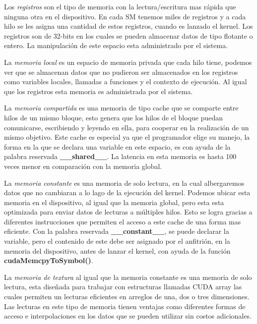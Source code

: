 Los \textit{registros} son el tipo de memoria con la lectura/escritura mas rápida que ninguna otra en el dispositivo. En cada SM tenemos miles de registros y a cada hilo se les asigna una cantidad de estos registros, cuando es lanzado el kernel. Los registros son de 32-bits en los cuales se pueden almacenar datos de tipo flotante o entero. La manipulación de este espacio esta administrado por el sistema.

La \textit{memoria local} es un espacio de memoria privada que cada hilo tiene, podemos ver que se almacenan datos que no pudieron ser almacenados en los registros como variables locales, llamadas a funciones y el contexto de ejecución. Al igual que los registros esta memoria es administrada por el sistema.

La \textit{memoria compartida} es una memoria de tipo cache que se comparte entre hilos de un mismo bloque, esto genera que los hilos de el bloque puedan comunicarse, escribiendo y leyendo en ella, para cooperar en la realización de un mismo objetivo. Este cache es especial ya que el programador elige su manejo, la forma en la que se declara una variable en este espacio, es con ayuda de la palabra reservada \textbf{\_\_shared\_\_}. La latencia en esta memoria es hasta 100 veces menor en comparación con la memoria global. 

La\textit{ memoria constante} es una memoria de solo lectura, en la cual albergaremos datos que no cambiaran a lo lago de la ejecución del kernel. Podemos ubicar esta memoria en el dispositivo, al igual que la memoria global, pero esta esta optimizada para enviar datos de lecturas a múltiples hilos. Esto se logra gracias a diferentes instrucciones  que permiten el acceso a este cache de una forma mas eficiente. Con la palabra reservada \textbf{\_\_constant\_\_}, se puede declarar la variable, pero el contenido de este debe ser asignado por el anfitrión, en la memoria del dispositivo, antes de lanzar el kernel, con ayuda de la función \textbf{cudaMemcpyToSymbol()}.

La \textit{memoria de textura} al igual que la memoria constante es una memoria de solo lectura, esta diseñada para trabajar con estructuras llamadas CUDA array las cuales permiten un lecturas eficientes en arreglos de una, dos o tres dimensiones. Las lecturas en este tipo de memoria tienen ventajas como diferentes formas de acceso e interpolaciones en los datos que se pueden utilizar sin costos adicionales.




